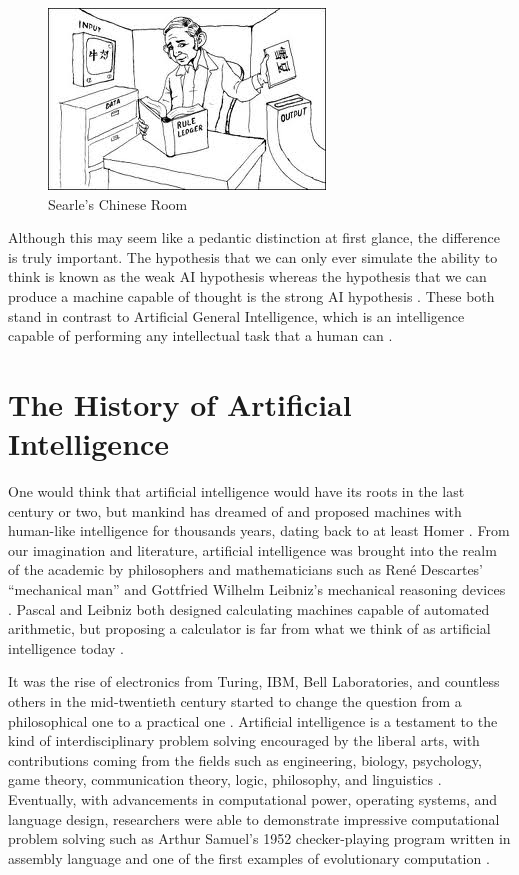 \documentclass[oneside,12pt,openany]{book}
\begin{document}
	\begin{figure}[hbt!]
		\centering
		\includegraphics[width=.4\linewidth]{images/ChineseRoom.jpg}
		\caption[Searle's Chinese Room]{Searle's Chinese Room\footnotemark}
		\label{fig:ChineseRoom}
	\end{figure}
	
	Although this may seem like a pedantic distinction at first glance, the difference is truly important. The hypothesis that we can only ever simulate the ability to think is known as the weak AI hypothesis whereas the hypothesis that we can produce a machine capable of thought is the strong AI hypothesis \cite{Jones}. These both stand in contrast to Artificial General Intelligence, which is an intelligence capable of performing any intellectual task that a human can \cite{Buchanan}.
	
	\section{The History of Artificial Intelligence}
	
	
	One would think that artificial intelligence would have its roots in the last century or two, but mankind has dreamed of and proposed machines with human-like intelligence for thousands years, dating back to at least Homer \cite{Buchanan}. From our imagination and literature, artificial intelligence was brought into the realm of the academic by philosophers and mathematicians such as Ren\'e Descartes' ``mechanical man'' and Gottfried Wilhelm Leibniz's mechanical reasoning devices \cite{Buchanan}. Pascal and Leibniz both designed calculating machines capable of automated arithmetic, but proposing a calculator is far from what we think of as artificial intelligence today  \cite{Buchanan}.
	
	It was the rise of electronics from Turing, IBM, Bell Laboratories, and countless others in the mid-twentieth century started to change the question from a philosophical one to a practical one \cite{Buchanan}. Artificial intelligence is a testament to the kind of interdisciplinary problem solving encouraged by the liberal arts, with contributions coming from the fields such as engineering, biology, psychology, game theory, communication theory, logic, philosophy, and linguistics \cite{Buchanan}. Eventually, with advancements in computational power, operating systems, and language design, researchers were able to demonstrate impressive  computational problem solving such as Arthur Samuel's 1952 checker-playing program written in assembly language and one of the first examples of evolutionary computation \cite{Buchanan}. 
	
\end{document}

